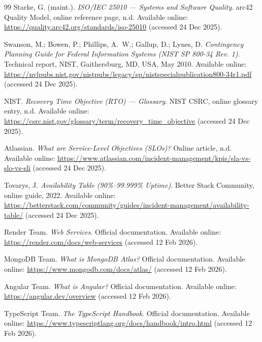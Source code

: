 \begin{thebibliography}{99}
Starke, G. (maint.).
\newblock \emph{ISO/IEC 25010 --- Systems and Software Quality}.
\newblock arc42 Quality Model, online reference page, n.d.
\newblock Available online: \url{https://quality.arc42.org/standards/iso-25010} (accessed 24 Dec 2025).

Swanson, M.; Bowen, P.; Phillips, A.~W.; Gallup, D.; Lynes, D.
\newblock \emph{Contingency Planning Guide for Federal Information Systems (NIST SP 800-34 Rev. 1)}.
\newblock Technical report, NIST, Gaithersburg, MD, USA, May 2010.
\newblock Available online: \url{https://nvlpubs.nist.gov/nistpubs/legacy/sp/nistspecialpublication800-34r1.pdf} (accessed 24 Dec 2025).

NIST.
\newblock \emph{Recovery Time Objective (RTO) --- Glossary}.
\newblock NIST CSRC, online glossary entry, n.d.
\newblock Available online: \url{https://csrc.nist.gov/glossary/term/recovery_time_objective} (accessed 24 Dec 2025).

Atlassian.
\newblock \emph{What are Service-Level Objectives (SLOs)?}
\newblock Online article, n.d.
\newblock Available online: \url{https://www.atlassian.com/incident-management/kpis/sla-vs-slo-vs-sli} (accessed 24 Dec 2025).

Tovarys, J.
\newblock \emph{Availability Table (90\%--99.999\% Uptime)}.
\newblock Better Stack Community, online guide, 2022.
\newblock Available online: \url{https://betterstack.com/community/guides/incident-management/availability-table/} (accessed 24 Dec 2025).

 Render Team. 
\newblock \emph{Web Services}. 
\newblock Official documentation. 
\newblock Available online: \url{https://render.com/docs/web-services} (accessed 12 Feb 2026).

 MongoDB Team. 
\newblock \emph{What is MongoDB Atlas?} 
\newblock Official documentation. 
\newblock Available online: \url{https://www.mongodb.com/docs/atlas/} (accessed 12 Feb 2026).

Angular Team.
\newblock \emph{What is Angular?}
\newblock Official documentation.
\newblock Available online: \url{https://angular.dev/overview} (accessed 12 Feb 2026).

TypeScript Team.
\newblock \emph{The TypeScript Handbook}.
\newblock Official documentation.
\newblock Available online: \url{https://www.typescriptlang.org/docs/handbook/intro.html} (accessed 12 Feb 2026).


\end{thebibliography}

